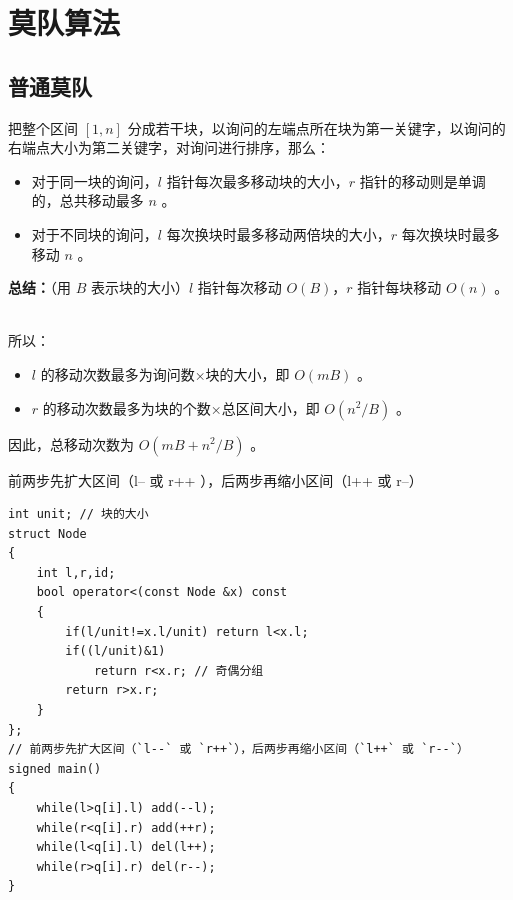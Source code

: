 \section{莫队算法}
\subsection{普通莫队}
\par \noindent 把整个区间 $[1,n]$ 分成若干块，以询问的左端点所在块为第一关键字，以询问的右端点大小为第二关键字，对询问进行排序，那么：
\begin{itemize}
\item 对于同一块的询问，$l$ 指针每次最多移动块的大小，$r$ 指针的移动则是单调的，总共移动最多 $n$ 。
\item 对于不同块的询问，$l$ 每次换块时最多移动两倍块的大小，$r$ 每次换块时最多移动 $n$ 。
\end{itemize}

\par \noindent \textbf{总结：}（用 $B$ 表示块的大小）$l$ 指针每次移动 $O(B)$，$r$ 指针每块移动 $O(n)$ 。
~\\
\par \noindent 所以：
\begin{itemize}
\item $l$ 的移动次数最多为询问数×块的大小，即 $O(mB)$ 。
\item $r$ 的移动次数最多为块的个数×总区间大小，即 $O(n^2/B)$ 。
\end{itemize}

\par \noindent 因此，总移动次数为 $O(mB+n^2/B)$ 。
~\\
\par \noindent 前两步先扩大区间（l-- 或 r++ ），后两步再缩小区间（l++ 或 r--）
\begin{verbatim}
int unit; // 块的大小
struct Node
{
    int l,r,id;
    bool operator<(const Node &x) const
    {
        if(l/unit!=x.l/unit) return l<x.l;
        if((l/unit)&1)
            return r<x.r; // 奇偶分组
        return r>x.r;
    }
};
// 前两步先扩大区间（`l--` 或 `r++`），后两步再缩小区间（`l++` 或 `r--`）
signed main()
{
    while(l>q[i].l) add(--l);
    while(r<q[i].r) add(++r);
    while(l<q[i].l) del(l++);
    while(r>q[i].r) del(r--);
}
\end{verbatim}
